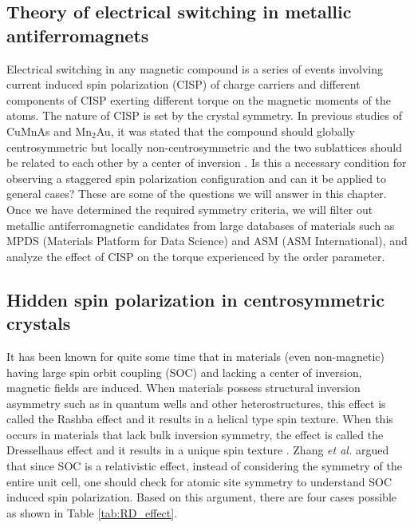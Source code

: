 \documentclass[10pt,doublespacing,edeposit]{uiucthesis2020}
\begin{document}
\begin{mainmatter}
\chapter{Theory of electrical switching in metallic antiferromagnets}

Electrical switching in any magnetic compound is a series of events involving current induced spin polarization (CISP) of charge carriers and different components of CISP exerting different torque on the magnetic moments of the atoms. The nature of CISP is set by the crystal symmetry. In previous studies of CuMnAs and Mn$_2$Au, it was stated that the compound should globally centrosymmetric but locally non-centrosymmetric and the two sublattices should be related to each other by a center of inversion \cite{Zelezny2014,Zelezny2017,Wadley2016}. Is this a necessary condition for observing a staggered spin polarization configuration and can it be applied to general cases? These are some of the questions we will answer in this chapter. Once we have determined the required symmetry criteria, we will filter out metallic antiferromagnetic candidates from large databases of materials such as MPDS (Materials Platform for Data Science) and ASM (ASM International), and analyze the effect of CISP on the torque experienced by the order parameter.

\section{Hidden spin polarization in centrosymmetric crystals}

It has been known for quite some time that in materials (even non-magnetic) having large spin orbit coupling (SOC) and lacking a center of inversion, magnetic fields are induced. When materials possess structural inversion asymmetry such as in quantum wells and other heterostructures, this effect is called the Rashba effect and it results in a helical type spin texture. When this occurs in materials that lack bulk inversion symmetry, the effect is called the Dresselhaus effect and it results in a unique spin texture \cite{Zhang2014}. Zhang \emph{et al.} \cite{Zhang2014} argued that since SOC is a relativistic effect, instead of considering the symmetry of the entire unit cell, one should check for atomic site symmetry to understand SOC induced spin polarization. Based on this argument, there are four cases possible as shown in Table \ref{tab:RD_effect}.


\end{mainmatter}
\end{document}
